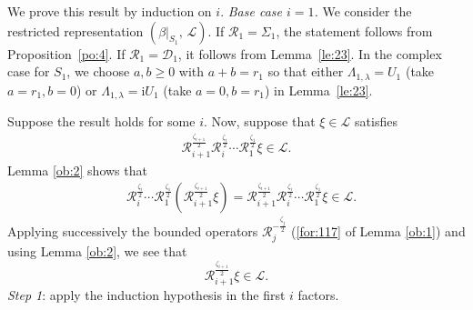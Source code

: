 \documentclass[11 pt]{amsart}
\theoremstyle{definition}
\numberwithin{equation}{section}
\begin{document}
We prove this result by induction on $i$.  \emph{Base case $i=1$.} We consider the restricted representation $(\beta|_{S_1},\,\mathcal{L})$.
If $\mathcal R_1=\Sigma_1$, the statement follows from
Proposition~\ref{po:4}. If $\mathcal R_1=\mathcal D_1$, it follows from
Lemma~\ref{le:23}. In the complex case for $S_{1}$, we choose $a,b\ge0$ with
$a+b=r_{1}$ so that either $\Lambda_{1,\lambda}=U_{1}$ (take $a=r_{1},b=0$) or
$\Lambda_{1,\lambda}=\mathrm{i}U_{1}$ (take $a=0,b=r_{1}$) in Lemma~\ref{le:23}.

Suppose the result holds for some $i$. Now, suppose that $\xi\in \mathcal{L}$ satisfies
\begin{align*}
 \mathcal{R}_{i+1}^{\frac{\zeta_{i+1}}{2}}\mathcal{R}_i^{\frac{\zeta_i}{2}}\cdots\mathcal{R}_1^{\frac{\zeta_1}{2}}\xi\in \mathcal{L}.
\end{align*}
 Lemma \ref{ob:2} shows that
\begin{align}\label{for:162}
   &\mathcal{R}_i^{\frac{\zeta_i}{2}}\cdots\mathcal{R}_1^{\frac{\zeta_1}{2}}(\mathcal{R}_{i+1}^{\frac{\zeta_{i+1}}{2}}\xi)=\mathcal{R}_{i+1}^{\frac{\zeta_{i+1}}{2}}\mathcal{R}_i^{\frac{\zeta_i}{2}}\cdots
   \mathcal{R}_1^{\frac{\zeta_1}{2}}\xi\in \mathcal{L}.
\end{align}
Applying successively the bounded operators \(\mathcal{R}_j^{-\frac{\zeta_j}{2}}\) (\eqref{for:117} of Lemma \ref{ob:1}) and using Lemma \ref{ob:2}, we see that
\begin{equation}\label{for:159}
 \mathcal{R}_{i+1}^{\frac{\zeta_{i+1}}{2}}\xi\in\mathcal{L}.
\end{equation}
\emph{Step 1}: apply the induction hypothesis in the first $i$ factors.
\end{document}
